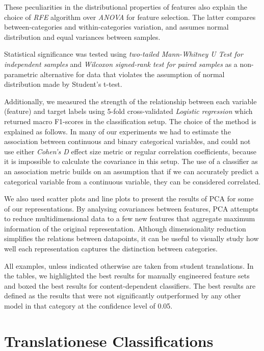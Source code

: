 These peculiarities in the distributional properties of features also explain the choice of \textit{RFE} algorithm over \textit{ANOVA} for feature selection. The latter compares between-categories and within-categories variation, and assumes normal distribution and equal variances between samples.

Statistical significance was tested using \textit{two-tailed Mann-Whitney U Test for independent samples} and \textit{Wilcoxon signed-rank test for paired samples} as a non-parametric alternative for data that violates the assumption of normal distribution made by Student's t-test.

Additionally, we measured the strength of the relationship between each variable (feature) and target labels using 5-fold cross-validated \textit{Logistic regression} which returned macro F1-scores in the classification setup. 
The choice of the method is explained as follows. In many of our experiments we had to estimate the association between continuous and binary categorical variables, and could not use either \textit{Cohen's D} effect size metric or regular correlation coefficients, because it is impossible to calculate the covariance in this setup. The use of a classifier as an association metric builds on an assumption that if we can accurately predict a categorical variable from a continuous variable, they can be considered correlated. 

We also used scatter plots and line plots to present the results of \gls{PCA} for some of our representations. By analysing covariances between features, PCA attempts to reduce multidimensional data to a few new features that aggregate maximum information of the original representation. Although dimensionality reduction simplifies the relations between datapoints, it can be useful to visually study how well each representation captures the distinction between categories. 

All examples, unless indicated otherwise are taken from student translations. In the tables, we highlighted the best results for manually engineered feature sets and boxed the best results for content-dependent classifiers. The best results are defined as the results that were not significantly outperformed by any other model in that category at the confidence level of 0.05. 

\section{\label{sec:detect}Translationese Classifications}

